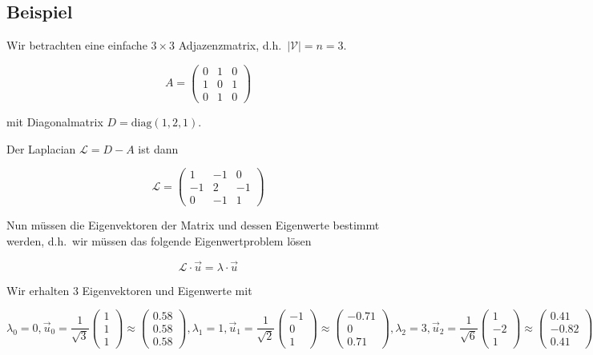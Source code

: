\subsection{Beispiel}

Wir betrachten eine einfache $3 \times 3$ Adjazenzmatrix, d.h.\ $|\mathcal{V}| = n = 3$.

\begin{equation}
  A = \begin{pmatrix}
    0 & 1 & 0\\
    1 & 0 & 1\\
    0 & 1 & 0
  \end{pmatrix}
\end{equation}

mit Diagonalmatrix $D = \text{diag}(1, 2, 1)$.

Der Laplacian $\mathcal{L} = D - A$ ist dann

\begin{equation}
  \mathcal{L} = \begin{pmatrix}
    1 & -1 & 0\\
    -1 & 2 & -1\\
    0 & -1 & 1
  \end{pmatrix}
\end{equation}

Nun müssen die Eigenvektoren der Matrix und dessen Eigenwerte bestimmt werden, d.h.\ wir müssen das folgende Eigenwertproblem lösen

\begin{equation}
  \mathcal{L} \cdot \vec{u} = \lambda \cdot \vec{u}
\end{equation}

Wir erhalten $3$ Eigenvektoren und Eigenwerte mit

\begin{equation}
  \lambda_0 = 0, \vec{u}_0 = \frac{1}{\sqrt{3}} \begin{pmatrix}1\\1\\1\end{pmatrix} \approx \begin{pmatrix}0.58\\0.58\\0.58\end{pmatrix},
    \lambda_1 = 1, \vec{u}_1 = \frac{1}{\sqrt{2}} \begin{pmatrix}-1\\0\\1\end{pmatrix} \approx \begin{pmatrix}-0.71\\0\\0.71\end{pmatrix},
      \lambda_2 = 3, \vec{u}_2 = \frac{1}{\sqrt{6}} \begin{pmatrix}1\\-2\\1\end{pmatrix} \approx \begin{pmatrix}0.41\\-0.82\\0.41\end{pmatrix}
\end{equation}

